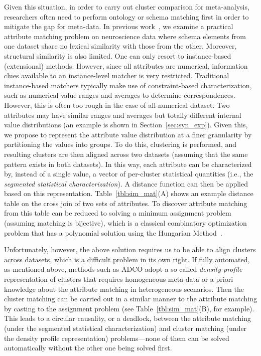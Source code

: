 Given this situation, in order to carry out cluster comparison for meta-analysis, researchers often need to perform ontology or schema matching first in order to mitigate the gap for meta-data. In previous work~\cite{LiuEtal10}, we examine a practical attribute matching problem on neuroscience data where schema elements from one dataset share no lexical similarity with those from the other. Moreover, structural similarity is also limited. One can only resort to instance-based (extensional) methods. However, since all attributes are numerical, information clues available to an instance-level matcher is very restricted. Traditional instance-based matchers typically make use of constraint-based characterization, such as numerical value ranges and averages to determine correspondences. However, this is often too rough in the case of all-numerical dataset. Two attributes may have similar ranges and averages but totally different internal value distributions (an example is shown in Section~\ref{sec:syn_exp}). Given this, we propose to represent the attribute value distribution at a finer granularity by partitioning the values into groups. To do this, clustering is performed, and resulting clusters are then aligned across two datasets (assuming that the same pattern exists in both datasets). In this way, each attribute can be characterized by, instead of a single value, a vector of per-cluster statistical quantities (i.e., the \emph{segmented statistical characterization}). A distance function can then be applied based on this representation. Table~\ref{tbl:sim_mat}(A) shows an example distance table on the cross join of two sets of attributes. To discover attribute matching from this table can be reduced to solving a minimum assignment problem (assuming matching is bijective), which is a classical combinatory optimization problem that has a polynomial solution using the Hungarian Method~\cite{Kuhn1955}.

Unfortunately, however, the above solution requires us to be able to align clusters across datasets, which is a difficult problem in its own right. If fully automated, as mentioned above, methods such as ADCO adopt a so called \emph{density profile}~\cite{Bae2010} representation of clusters that requires homogeneous meta-data or a priori knowledge about the attribute matching in heterogeneous scenarios. Then the cluster matching can be carried out in a similar manner to the attribute matching by casting to the assignment problem (see Table~\ref{tbl:sim_mat}(B), for example). This leads to a circular causality, or a deadlock, between the attribute matching (under the segmented statistical characterization) and cluster matching (under the density profile representation) problems---none of them can be solved automatically without the other one being solved first.


